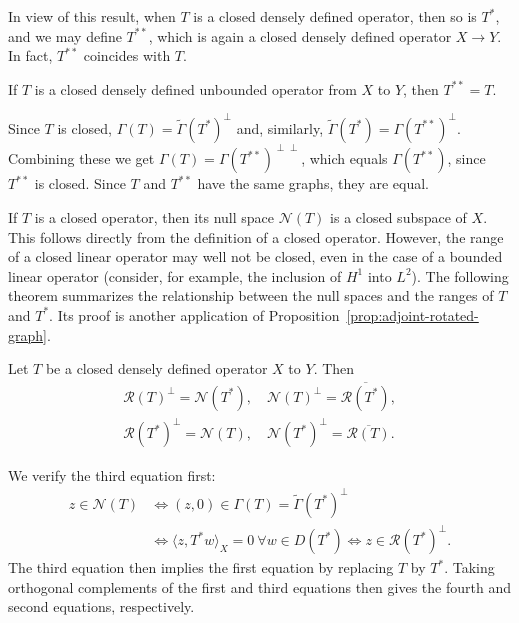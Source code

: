 {In view of this result, when $T$ is a closed densely defined operator, then so is $T^*$, and we may define $T^{**}$, which is again a closed densely defined operator $X\to Y$. In fact, $T^{**}$ coincides with $T$.}

\begin{Proposition}\label{prop:double-adjoint-identity}
{If $T$ is a closed densely defined unbounded operator from $X$ to $Y$, then $T^{**}=T$.}
\end{Proposition}

\begin{Proof}
{Since $T$ is closed, $\Gamma(T)=\widetilde\Gamma(T^*)^\perp$ and, similarly, $\widetilde\Gamma(T^*)=\Gamma(T^{**})^\perp$. Combining these we get $\Gamma(T)=\Gamma(T^{**})^{\perp\perp}$, which equals $\Gamma(T^{**})$, since $T^{**}$ is closed. Since $T$ and $T^{**}$ have the same graphs, they are equal.}
\end{Proof}

{If $T$ is a closed operator, then its null space $\mathcal N(T)$ is a closed subspace of $X$. This follows directly from the definition of a closed operator. However, the range of a closed linear operator may well not be closed, even in the case of a bounded linear operator (consider, for example, the inclusion of $H^1$ into $L^2$). The following theorem summarizes the relationship between the null spaces and the ranges of $T$ and $T^*$. Its proof is another application of Proposition~\ref{prop:adjoint-rotated-graph}.}

\begin{Theorem}\label{thm:adjoint-kernel-range-orthogonality}
{Let $T$ be a closed densely defined operator $X$ to $Y$. Then}
\[
\begin{gathered}
\mathcal R(T)^\perp=\mathcal N(T^*),\quad\mathcal N(T)^\perp=\overline{\mathcal R(T^*)},\\
\mathcal R(T^*)^\perp=\mathcal N(T),\quad\mathcal N(T^*)^\perp=\overline{\mathcal R(T)}.
\end{gathered}
\]
\end{Theorem}

\begin{Proof}
{We verify the third equation first:}
\[
\begin{aligned}
z\in\mathcal N(T)&\iff(z,0)\in\Gamma(T)=\widetilde\Gamma(T^*)^\perp\\
&\iff\langle z,T^*w\rangle_X=0\ \forall w\in D(T^*)\iff z\in\mathcal R(T^*)^\perp.
\end{aligned}
\]
{The third equation then implies the first equation by replacing $T$ by $T^*$. Taking orthogonal complements of the first and third equations then gives the fourth and second equations, respectively.}
\end{Proof}

